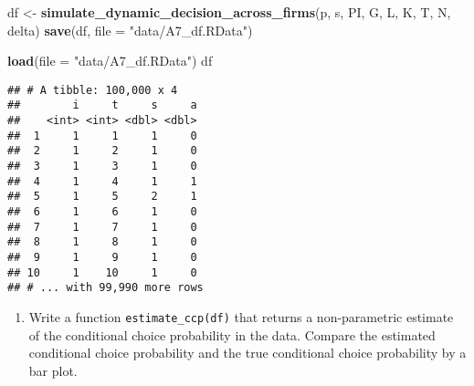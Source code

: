 \documentclass[
]{book}
\newenvironment{Shaded}{\begin{snugshade}}{\end{snugshade}}
\newcommand{\DataTypeTok}[1]{\textcolor[rgb]{0.13,0.29,0.53}{#1}}
\newcommand{\KeywordTok}[1]{\textcolor[rgb]{0.13,0.29,0.53}{\textbf{#1}}}
\newcommand{\NormalTok}[1]{#1}
\newcommand{\StringTok}[1]{\textcolor[rgb]{0.31,0.60,0.02}{#1}}
\providecommand{\tightlist}{%
  \setlength{\itemsep}{0pt}\setlength{\parskip}{0pt}}
\begin{document}
\begin{Shaded}
\begin{Highlighting}[]
\NormalTok{df <-}\StringTok{ }\KeywordTok{simulate_dynamic_decision_across_firms}\NormalTok{(p, s, PI, G, L, K, T, N, delta)}
\KeywordTok{save}\NormalTok{(df, }\DataTypeTok{file =} \StringTok{"data/A7_df.RData"}\NormalTok{)}
\end{Highlighting}
\end{Shaded}

\begin{Shaded}
\begin{Highlighting}[]
\KeywordTok{load}\NormalTok{(}\DataTypeTok{file =} \StringTok{"data/A7_df.RData"}\NormalTok{)}
\NormalTok{df}
\end{Highlighting}
\end{Shaded}

\begin{verbatim}
## # A tibble: 100,000 x 4
##        i     t     s     a
##    <int> <int> <dbl> <dbl>
##  1     1     1     1     0
##  2     1     2     1     0
##  3     1     3     1     0
##  4     1     4     1     1
##  5     1     5     2     1
##  6     1     6     1     0
##  7     1     7     1     0
##  8     1     8     1     0
##  9     1     9     1     0
## 10     1    10     1     0
## # ... with 99,990 more rows
\end{verbatim}

\begin{enumerate}
\def\labelenumi{\arabic{enumi}.}
\setcounter{enumi}{7}
\tightlist
\item
  Write a function \texttt{estimate\_ccp(df)} that returns a non-parametric estimate of the conditional choice probability in the data. Compare the estimated conditional choice probability and the true conditional choice probability by a bar plot.
\end{enumerate}
\end{document}
